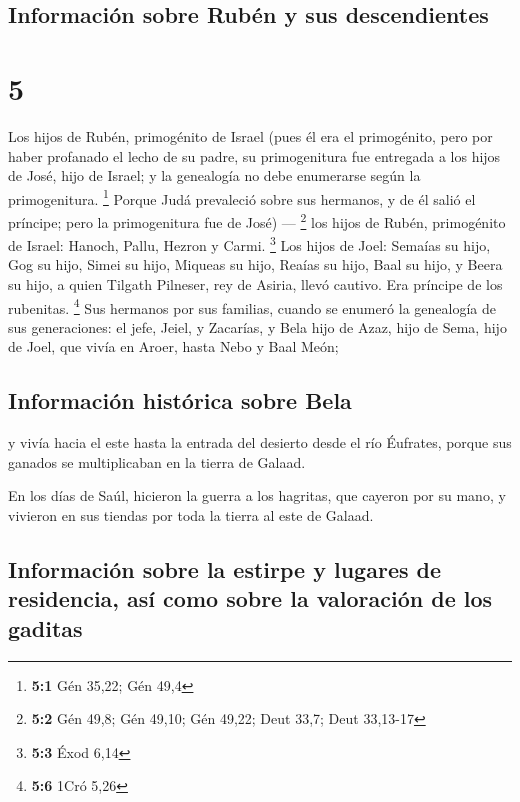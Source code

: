 \hypertarget{informaciuxf3n-sobre-rubuxe9n-y-sus-descendientes}{%
\subsection{Información sobre Rubén y sus
descendientes}\label{informaciuxf3n-sobre-rubuxe9n-y-sus-descendientes}}

\hypertarget{section-4}{%
\section{5}\label{section-4}}

 Los hijos de Rubén, primogénito de Israel (pues él era el
primogénito, pero por haber profanado el lecho de su padre, su
primogenitura fue entregada a los hijos de José, hijo de Israel; y la
genealogía no debe enumerarse según la primogenitura. \footnote{\textbf{5:1}
  Gén 35,22; Gén 49,4}  Porque Judá prevaleció sobre sus
hermanos, y de él salió el príncipe; pero la primogenitura fue de José)
--- \footnote{\textbf{5:2} Gén 49,8; Gén 49,10; Gén 49,22; Deut 33,7;
  Deut 33,13-17}  los hijos de Rubén, primogénito de
Israel: Hanoch, Pallu, Hezron y Carmi. \footnote{\textbf{5:3} Éxod 6,14}
 Los hijos de Joel: Semaías su hijo, Gog su hijo, Simei su
hijo,  Miqueas su hijo, Reaías su hijo, Baal su hijo,
 y Beera su hijo, a quien Tilgath Pilneser, rey de Asiria,
llevó cautivo. Era príncipe de los rubenitas. \footnote{\textbf{5:6}
  1Cró 5,26}  Sus hermanos por sus familias, cuando se
enumeró la genealogía de sus generaciones: el jefe, Jeiel, y Zacarías,
 y Bela hijo de Azaz, hijo de Sema, hijo de Joel, que
vivía en Aroer, hasta Nebo y Baal Meón;

\hypertarget{informaciuxf3n-histuxf3rica-sobre-bela}{%
\subsection{Información histórica sobre
Bela}\label{informaciuxf3n-histuxf3rica-sobre-bela}}

 y vivía hacia el este hasta la entrada del desierto desde
el río Éufrates, porque sus ganados se multiplicaban en la tierra de
Galaad.

 En los días de Saúl, hicieron la guerra a los hagritas,
que cayeron por su mano, y vivieron en sus tiendas por toda la tierra al
este de Galaad.

\hypertarget{informaciuxf3n-sobre-la-estirpe-y-lugares-de-residencia-asuxed-como-sobre-la-valoraciuxf3n-de-los-gaditas}{%
\subsection{Información sobre la estirpe y lugares de residencia, así
como sobre la valoración de los
gaditas}\label{informaciuxf3n-sobre-la-estirpe-y-lugares-de-residencia-asuxed-como-sobre-la-valoraciuxf3n-de-los-gaditas}}

